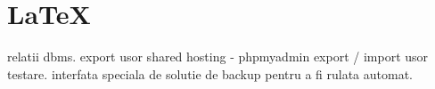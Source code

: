 \section{\LaTeX}
	relatii
	dbms.
	export usor shared hosting - phpmyadmin
	export / import usor testare.
	interfata speciala de solutie de backup pentru a fi rulata automat.
